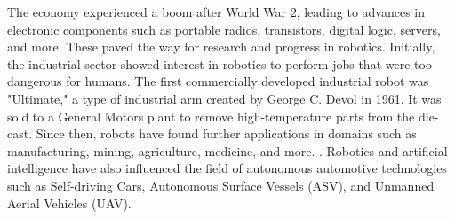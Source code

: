 The economy experienced a boom after World War 2, leading to advances in electronic components such as portable radios, transistors, digital logic, servers, and more. These paved the way for research and progress in robotics. Initially, the industrial sector showed interest in robotics to perform jobs that were too dangerous for humans. The first commercially developed industrial robot was "Ultimate," a type of industrial arm created by George C. Devol in 1961. It was sold to a General Motors plant to remove high-temperature parts from the die-cast. Since then, robots have found further applications in domains such as manufacturing, mining, agriculture, medicine, and more. \cite{stone2018history}. Robotics and artificial intelligence have also influenced the field of autonomous automotive technologies such as Self-driving Cars, Autonomous Surface Vessels (ASV), and Unmanned Aerial Vehicles (UAV). 
\\

